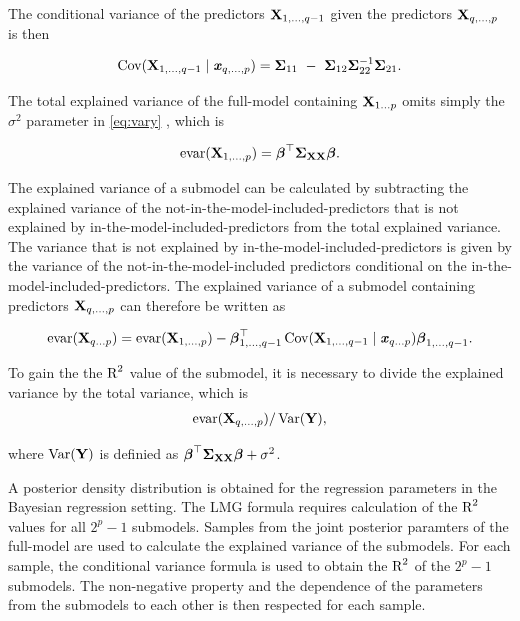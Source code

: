 \documentclass[11pt,a4paper,twoside]{book}\usepackage[]{graphicx}\usepackage[]{color}
\begin{document}
 The conditional variance of the predictors $ {\mathbf{X}}_{1 ,\dotsc, q-1} $ given the predictors  $ {\mathbf{X}}_{q ,\dotsc, p} $ is then
 
          \begin{align*} 
 \cov(\X_{1,\dotsc, q-1} \mid \x_{q ,\dotsc, p}) = \bSigma_{11}\ -\ \bSigma_{12} \bSigma_{22}^{-1}\bSigma_{21} .
       \end{align*}
       
       The total explained variance of the full-model containing ${\mathbf{X}}_{1 \dots p}$ omits simply the $\sigma^2$ parameter in \eqref{eq:vary} , which is

      \begin{align*} 
        \text{evar}({\mathbf{X}}_{1 ,\dotsc, p}) = {\boldsymbol{\beta}}^\top {\boldsymbol{\Sigma}}{}_{{\mathbf{X}} {\mathbf{X}}}  {\boldsymbol{\beta}}. 
   \end{align*}

The explained variance of a submodel can be calculated by subtracting the explained variance of the not-in-the-model-included-predictors that is not explained by in-the-model-included-predictors from the total explained variance. The variance that is not explained by in-the-model-included-predictors is given by the variance of the not-in-the-model-included predictors conditional on the in-the-model-included-predictors. The explained variance of a submodel containing predictors ${\mathbf{X}}_{q ,\dotsc, p}$ can therefore be written as

       \begin{align} 
       \text{evar}({\mathbf{X}}_{q \dots p}) =  \text{evar}({\mathbf{X}}_{1  ,\dotsc, p}) - {\boldsymbol{\beta}}^\top_{1 ,\dotsc, q-1} \operatorname{Cov}({\mathbf{X}}_{1,\dotsc, {q-1}} \mid {\textbf{\textit{x}}}_{q \dots p}) {\boldsymbol{\beta}}_{1 ,\dotsc, {q-1}} . \label{eq:varsub} 
   \end{align}

To gain the the $\text{R}^2$ value of the submodel, it is necessary to divide the explained variance by the total variance, which is
       \begin{align*} 
\text{evar}({\mathbf{X}}_{q ,\dotsc, p}) / \operatorname{Var}({\mathbf{Y}}),   
\end{align*}

where $\operatorname{Var}({\mathbf{Y}})$ is definied as  ${\boldsymbol{\beta}}^\top {\boldsymbol{\Sigma}}{}_{{\mathbf{X}} {\mathbf{X}}}  {\boldsymbol{\beta}} + \sigma^2$.



A posterior density distribution is obtained for the regression parameters in the Bayesian regression setting. The LMG formula requires calculation of the $\text{R}^2$ values for all $2^p-1$ submodels. Samples from the joint posterior paramters of the full-model are used to calculate the explained variance of the  submodels. For each sample, the  conditional variance formula is used to obtain the $\text{R}^2$ of the $2^p-1$ submodels. The non-negative property and the dependence of the parameters from the submodels to each other is then respected for each sample. 
\end{document}
